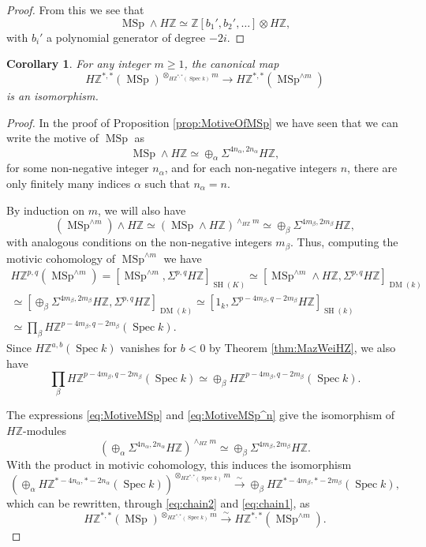 \documentclass[10pt]{amsart}
\theoremstyle{definition}
\theoremstyle{plain}
\newtheorem{corollary}[defn]{Corollary}
\numberwithin{equation}{section}
\newcommand{\0}{\emptyset}
\newcommand{\Z}{{\mathbb Z}}
\newcommand{\MSp}{{\operatorname{MSp}}}
\newcommand{\Spec}{{\operatorname{Spec}}}
\newcommand{\SH}{{\operatorname{SH}}}
\newcommand{\DM}{{\operatorname{DM}}}
\begin{document}
\begin{proof}
    From this we see that 
    $$\MSp \wedge H\Z \simeq \Z[b_1',b_2',\ldots] \otimes H\Z,$$
with $b_i'$ a polynomial generator of degree $-2i$.
\end{proof}

\begin{corollary}
\label{cor:product_map}
    For any integer $m \ge 1$, the canonical map
    $$H\Z^{*,*}(\MSp)^{\otimes_{H\Z^{*,*}(\Spec k)}m} \to H\Z^{*,*}(\MSp^{\wedge m})$$
    is an isomorphism.
\end{corollary}

\begin{proof}
    In the proof of Proposition \ref{prop:MotiveOfMSp} we have seen that we can write the motive of $\MSp$ as
    \begin{equation}
    \label{eq:MotiveMSp}
        \MSp \wedge H\Z \simeq \oplus_\alpha \Sigma^{4n_\alpha,2n_\alpha}H\Z,
    \end{equation}
    for some non-negative integer $n_\alpha$, and for each non-negative integers $n$, there are only finitely many indices $\alpha$ such that $n_\alpha=n$.

    By induction on $m$, we will also have 
    \begin{equation}
    \label{eq:MotiveMSp^n}
       (\MSp^{\wedge m}) \wedge H\Z \simeq (\MSp \wedge H\Z)^{\wedge_{H\Z} m} \simeq \oplus_\beta \Sigma^{4m_\beta,2m_\beta}H\Z, 
    \end{equation}
    with analogous conditions on the non-negative integers $m_\beta$. Thus, computing the motivic cohomology of $\MSp^{\wedge m}$ we have
    \begin{multline}
    \label{eq:chain1}
        H\Z^{p,q}(\MSp^{\wedge m})=[\MSp^{\wedge m},\Sigma^{p,q}H\Z]_{\SH(K)} \simeq [\MSp^{\wedge m} \wedge H\Z, \Sigma^{p,q}H\Z]_{\DM(k)} \\
        \simeq [\oplus_\beta \Sigma^{4m_\beta,2m_\beta}H\Z,\Sigma^{p,q}H\Z]_{\DM(k)}\simeq [1_k,\Sigma^{p-4m_\beta,q-2m_\beta}H\Z]_{\SH(k)} \\ \simeq \prod_\beta H\Z^{p-4m_\beta,q-2m_\beta}(\Spec k).
    \end{multline}
    Since $H\Z^{a,b}(\Spec k)$ vanishes for $b<0$ by Theorem \ref{thm:MazWeiHZ}, we also have 
    \begin{equation}
    \label{eq:chain2}
        \prod_\beta H\Z^{p-4m_\beta,q-2m_\beta}(\Spec k) \simeq \oplus_\beta H\Z^{p-4m_\beta,q-2m_\beta}(\Spec k).
    \end{equation}

    The expressions \eqref{eq:MotiveMSp} and \eqref{eq:MotiveMSp^n} give the isomorphism of $H\Z$-modules
    $$(\oplus_\alpha \Sigma^{4n_\alpha,2n_\alpha}H\Z)^{\wedge_{H\Z} m} \simeq \oplus_\beta \Sigma^{4m_\beta,2m_\beta} H\Z.$$
    With the product in motivic cohomology, this induces the isomorphism
    $$(\oplus_\alpha H\Z^{*-4n_\alpha,*-2n_\alpha}(\Spec k))^{\otimes_{H\Z^{*,*}(\Spec k)} m} \xrightarrow{\sim} \oplus_\beta H\Z^{*-4m_\beta,*-2m_\beta}(\Spec k),$$
    which can be rewritten, through \eqref{eq:chain2} and \eqref{eq:chain1}, as
    $$H\Z^{*,*}(\MSp)^{\otimes_{H\Z^{*,*}(\Spec k)} m} \xrightarrow{\sim} H\Z^{*,*}(\MSp^{\wedge m}).$$
\end{proof}
\end{document}
